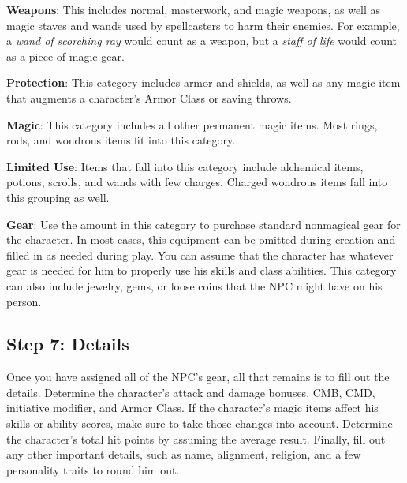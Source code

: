 \textbf{Weapons}: This includes normal, masterwork, and magic weapons, as well as magic staves and wands used by spellcasters to harm their enemies. For example, a \textit{wand of scorching ray} would count as a weapon, but a \textit{staff of life} would count as a piece of magic gear.
				
\textbf{Protection}: This category includes armor and shields, as well as any magic item that augments a character's Armor Class or saving throws.
				
\textbf{Magic}: This category includes all other permanent magic items. Most rings, rods, and wondrous items fit into this category.
				
\textbf{Limited Use}: Items that fall into this category include alchemical items, potions, scrolls, and wands with few charges. Charged wondrous items fall into this grouping as well.
				
\textbf{Gear}: Use the amount in this category to purchase standard nonmagical gear for the character. In most cases, this equipment can be omitted during creation and filled in as needed during play. You can assume that the character has whatever gear is needed for him to properly use his skills and class abilities. This category can also include jewelry, gems, or loose coins that the NPC might have on his person.
				
\subsection{Step 7: Details}

				
Once you have assigned all of the NPC's gear, all that remains is to fill out the details. Determine the character's attack and damage bonuses, CMB, CMD, initiative modifier, and Armor Class. If the character's magic items affect his skills or ability scores, make sure to take those changes into account. Determine the character's total hit points by assuming the average result. Finally, fill out any other important details, such as name, alignment, religion, and a few personality traits to round him out.
			        	